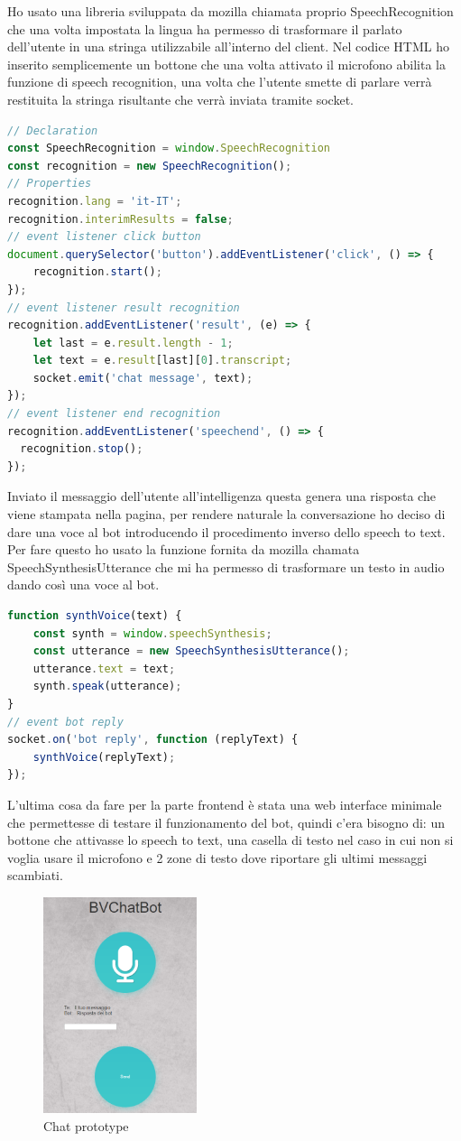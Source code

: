Ho usato una libreria sviluppata da mozilla chiamata proprio SpeechRecognition che una volta impostata la lingua ha permesso di trasformare il parlato dell'utente in una stringa utilizzabile all'interno del client.
Nel codice HTML ho inserito semplicemente un bottone che una volta attivato il microfono abilita la funzione di speech recognition, una volta che l'utente smette di parlare verrà restituita la stringa risultante che verrà inviata tramite socket.
\begin{lstlisting}[language=JavaScript]
// Declaration
const SpeechRecognition = window.SpeechRecognition
const recognition = new SpeechRecognition();
// Properties
recognition.lang = 'it-IT';
recognition.interimResults = false;
// event listener click button
document.querySelector('button').addEventListener('click', () => {
    recognition.start();
});
// event listener result recognition
recognition.addEventListener('result', (e) => {
    let last = e.result.length - 1;
    let text = e.result[last][0].transcript;
    socket.emit('chat message', text);
});
// event listener end recognition
recognition.addEventListener('speechend', () => {
  recognition.stop();
});
\end{lstlisting}
Inviato il messaggio dell'utente all'intelligenza questa genera una risposta che viene stampata nella pagina, per rendere naturale la conversazione ho deciso di dare una voce al bot introducendo il procedimento inverso dello speech to text. Per fare questo ho usato la funzione fornita da mozilla chamata SpeechSynthesisUtterance che mi ha permesso di trasformare un testo in audio dando così una voce al bot.
\begin{lstlisting}[language=JavaScript]
function synthVoice(text) {
    const synth = window.speechSynthesis;
    const utterance = new SpeechSynthesisUtterance();
    utterance.text = text;
    synth.speak(utterance);
}
// event bot reply
socket.on('bot reply', function (replyText) {
    synthVoice(replyText);
});
\end{lstlisting}
L'ultima cosa da fare per la parte frontend è stata una web interface minimale che permettesse di testare il funzionamento del bot, quindi c'era bisogno di: un bottone che attivasse lo speech to text, una casella di testo nel caso in cui non si voglia usare il microfono e 2 zone di testo dove riportare gli ultimi messaggi scambiati.
\begin{figure}[H]
 \centering
  \includegraphics[width=0.4\textwidth]{img/prototype.png}
 \caption{Chat prototype}
\end{figure}
